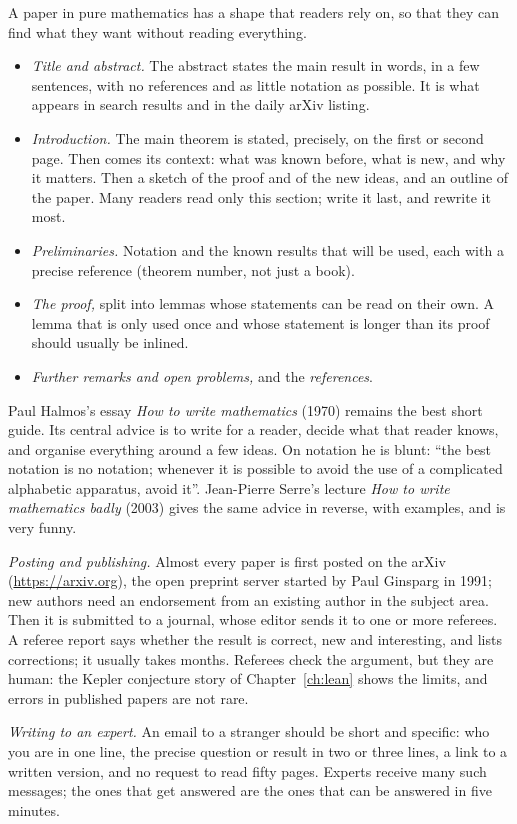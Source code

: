 A paper in pure mathematics has a shape that readers rely on, so that they can find what they want without reading everything.
\begin{itemize}
\item \emph{Title and abstract.} The abstract states the main result in words, in a few sentences, with no references and as little notation as possible. It is what appears in search results and in the daily arXiv listing.
\item \emph{Introduction.} The main theorem is stated, precisely, on the first or second page. Then comes its context: what was known before, what is new, and why it matters. Then a sketch of the proof
and of the new ideas, and an outline of the paper. Many readers read only this section; write it last, and rewrite it most.
\item \emph{Preliminaries.} Notation and the known results that will be used, each with a precise reference (theorem number, not just a book).
\item \emph{The proof,} split into lemmas whose statements can be read on their own. A lemma that is only used once and whose statement is longer than its proof should usually be inlined.
\item \emph{Further remarks and open problems,} and the \emph{references}.
\end{itemize}
Paul Halmos's essay \emph{How to write mathematics} (1970) remains the best short guide. Its central advice is to write for a reader, decide what that reader knows, and
organise everything around a few ideas. On notation he is blunt: ``the best notation is no notation; whenever it is possible to avoid the use of a complicated alphabetic apparatus, avoid it''.
Jean-Pierre Serre's lecture \emph{How to write mathematics badly} (2003) gives the same advice in reverse, with examples, and is very funny.

\emph{Posting and publishing.} Almost every paper is first posted on the arXiv (\url{https://arxiv.org}), the open preprint server started by Paul Ginsparg in 1991; new authors need an
endorsement from an existing author in the subject area. Then it is submitted to a journal, whose editor sends it to one or more referees. A referee report says whether the result is correct, new and
interesting, and lists corrections; it usually takes months. Referees check the argument, but they are human: the Kepler conjecture story of Chapter~\ref{ch:lean} shows the limits, and errors
in published papers are not rare.

\emph{Writing to an expert.} An email to a stranger should be short and specific: who you are in one line, the precise question or result in two or three lines, a link to a written version, and no request to read
fifty pages. Experts receive many such messages; the ones that get answered are the ones that can be answered in five minutes.


